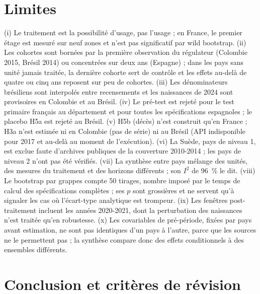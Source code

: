 \documentclass[11pt,a4paper]{article}
\begin{document}
\section{Limites}

(i) Le traitement est la possibilité d'usage, pas l'usage ; en France, le premier étage est mesuré sur neuf zones et n'est pas significatif par wild bootstrap. (ii) Les cohortes sont bornées par la première observation du régulateur (Colombie 2015, Brésil 2014) ou concentrées sur deux ans (Espagne) ; dans les pays sans unité jamais traitée, la dernière cohorte sert de contrôle et les effets au-delà de quatre ou cinq ans reposent sur peu de cohortes. (iii) Les dénominateurs brésiliens sont interpolés entre recensements et les naissances de 2024 sont provisoires en Colombie et au Brésil. (iv) Le pré-test est rejeté pour le test primaire français au département et pour toutes les spécifications espagnoles ; le placebo H5a est rejeté au Brésil. (v) H5b (décès) n'est construit qu'en France ; H3a n'est estimée ni en Colombie (pas de série) ni au Brésil (API indisponible pour 2017 et au-delà au moment de l'exécution). (vi) La Suède, pays de niveau 1, est exclue faute d'archives publiques de la couverture 2010-2014 ; les pays de niveau 2 n'ont pas été vérifiés. (vii) La synthèse entre pays mélange des unités, des mesures du traitement et des horizons différents ; son $I^2$ de 96~\% le dit. (viii) Le bootstrap par grappes compte 50 tirages, nombre imposé par le temps de calcul des spécifications complètes ; ses $p$ sont grossières et ne servent qu'à signaler les cas où l'écart-type analytique est trompeur. (ix) Les fenêtres post-traitement incluent les années 2020-2021, dont la perturbation des naissances n'est traitée qu'en robustesse. (x) Les covariables de pré-période, fixées par pays avant estimation, ne sont pas identiques d'un pays à l'autre, parce que les sources ne le permettent pas ; la synthèse compare donc des effets conditionnels à des ensembles différents.

\section{Conclusion et critères de révision}
\end{document}
